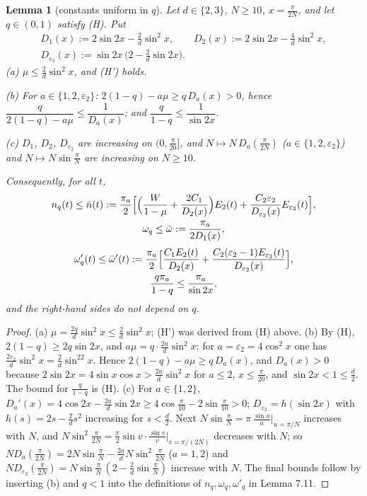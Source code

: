 \documentclass[11pt,a4paper]{article}
\newtheorem{lemma}[theorem]{Lemma}
\theoremstyle{definition}
\theoremstyle{remark}
\begin{document}
\begin{lemma}[{constants uniform in $q$}]
Let $d\in\{2,3\}$, $N\ge10$, $x=\frac{\pi}{2N}$, and let $q\in(0,1)$ satisfy (H). Put
\begin{gather*}
D_1(x):=2\sin2x-\tfrac2d\sin^2x, \qquad D_2(x):=2\sin2x-\tfrac4d\sin^2x, \\
D_{\varepsilon_2}(x):=\sin2x\,\bigl(2-\tfrac2d\sin2x\bigr).
\end{gather*}
(a) $\mu\le\frac2d\sin^2x$, and (H') holds.

(b) For $a\in\{1,2,\varepsilon_2\}$: $2(1-q)-a\mu\ge q\,D_a(x)>0$, hence $\dfrac{q}{2(1-q)-a\mu}\le\dfrac{1}{D_a(x)}$; and $\dfrac{q}{1-q}\le\dfrac{1}{\sin2x}$.

(c) $D_1$, $D_2$, $D_{\varepsilon_2}$ are increasing on $(0,\frac{\pi}{20}]$, and $N\mapsto N\,D_a(\frac{\pi}{2N})$ ($a\in\{1,2,\varepsilon_2\}$) and $N\mapsto N\sin\frac\pi N$ are increasing on $N\ge10$.

Consequently, for all $t$,
\begin{gather*}
n_q(t)\le\bar n(t):=\frac{\pi_a}{2}\Bigl[\Bigl(\frac{W}{1-\mu}+\frac{2C_1}{D_2(x)}\Bigr)E_2(t)+\frac{C_2\varepsilon_2}{D_{\varepsilon_2}(x)}E_{\varepsilon_2}(t)\Bigr], \\
\omega_q\le\bar\omega:=\frac{\pi_a}{2D_1(x)},
\end{gather*}
\begin{gather*}
\omega'_q(t)\le\bar\omega'(t):=\frac{\pi_a}{2}\Bigl[\frac{C_1E_2(t)}{D_2(x)}+\frac{C_2(\varepsilon_2-1)E_{\varepsilon_2}(t)}{D_{\varepsilon_2}(x)}\Bigr], \\
\frac{q\pi_a}{1-q}\le\frac{\pi_a}{\sin2x},
\end{gather*}
and the right-hand sides do not depend on $q$.
\end{lemma}

\begin{proof}
(a) $\mu=\frac{2q}{d}\sin^2x\le\frac2d\sin^2x$; (H') was derived from (H) above. (b) By (H), $2(1-q)\ge2q\sin2x$, and $a\mu=q\cdot\frac{2a}{d}\sin^2x$; for $a=\varepsilon_2=4\cos^2x$ one has $\frac{2\varepsilon_2}{d}\sin^2x=\frac2d\sin^22x$. Hence $2(1-q)-a\mu\ge q\,D_a(x)$, and $D_a(x)>0$ because $2\sin2x=4\sin x\cos x>\frac{2a}{d}\sin^2x$ for $a\le2$, $x\le\frac\pi{20}$, and $\sin2x<1\le\frac d2$. The bound for $\frac{q}{1-q}$ is (H). (c) For $a\in\{1,2\}$, $D_a'(x)=4\cos2x-\frac{2a}{d}\sin2x\ge4\cos\frac\pi{10}-2\sin\frac\pi{10}>0$; $D_{\varepsilon_2}=h(\sin2x)$ with $h(s)=2s-\frac2ds^2$ increasing for $s<\frac d2$. Next $N\sin\frac\pi N=\pi\,\frac{\sin u}{u}\big|_{u=\pi/N}$ increases with $N$, and $N\sin^2\frac{\pi}{2N}=\frac\pi2\sin v\cdot\frac{\sin v}{v}\big|_{v=\pi/(2N)}$ decreases with $N$; so $N D_a(\frac\pi{2N})=2N\sin\frac\pi N-\frac{2a}{d}N\sin^2\frac\pi{2N}$ ($a=1,2$) and $ND_{\varepsilon_2}(\frac\pi{2N})=N\sin\frac\pi N\,(2-\frac2d\sin\frac\pi N)$ increase with $N$. The final bounds follow by inserting (b) and $q<1$ into the definitions of $n_q,\omega_q,\omega'_q$ in Lemma 7.11.
\end{proof}
\end{document}
